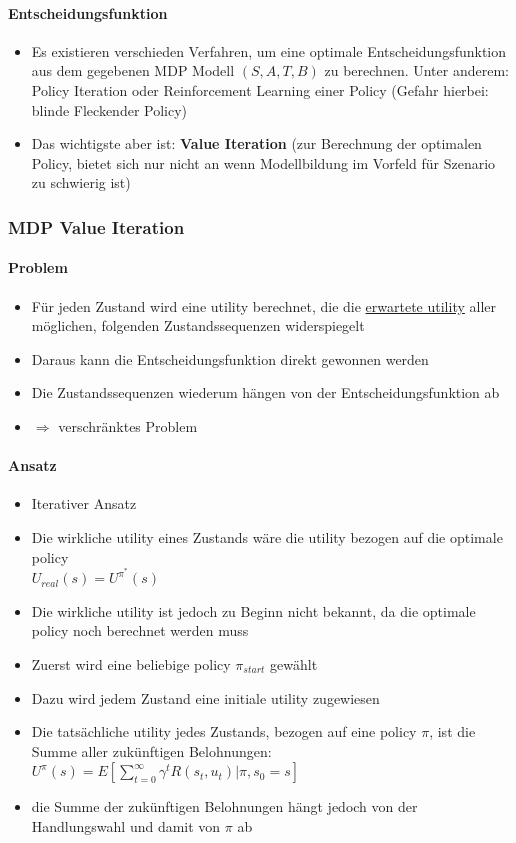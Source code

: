 \paragraph{Entscheidungsfunktion}
\begin{itemize}
	\item Es existieren verschieden Verfahren, um eine optimale Entscheidungsfunktion aus dem gegebenen MDP Modell $(S, A, T, B)$ zu berechnen.
	Unter anderem: Policy Iteration oder Reinforcement Learning einer Policy (Gefahr hierbei: \glqq blinde Flecken\grqq{}der Policy)
	\item Das wichtigste aber ist: \textbf{Value Iteration} (zur Berechnung der optimalen Policy, bietet sich nur nicht an wenn Modellbildung im Vorfeld für Szenario zu schwierig ist)
\end{itemize}

\subsubsection{MDP Value Iteration}

\paragraph{Problem}
\begin{itemize}
	\item F\"ur jeden Zustand wird eine utility berechnet, die die \underline{erwartete utility} aller m\"oglichen, folgenden Zustandssequenzen widerspiegelt
	\item Daraus kann die Entscheidungsfunktion direkt gewonnen werden
	\item Die Zustandssequenzen wiederum h\"angen von der Entscheidungsfunktion ab
	\item $\Rightarrow$ verschr\"anktes Problem
\end{itemize}

\paragraph{Ansatz}
\begin{itemize}
	\item Iterativer Ansatz
	\item Die wirkliche utility eines Zustands w\"are die utility bezogen auf die optimale policy\\ $U_{real}(s) = U^{\pi^*}(s)$
	\item Die wirkliche utility ist jedoch zu Beginn nicht bekannt, da die optimale policy noch berechnet werden muss
	\item Zuerst wird eine beliebige policy $\pi_{start}$ gew\"ahlt
	\item Dazu wird jedem Zustand eine initiale utility zugewiesen
	\item Die tats\"achliche utility jedes Zustands, bezogen auf eine policy $\pi$, ist die Summe aller zuk\"unftigen Belohnungen:
	$U^{\pi}(s) = E \left[ \sum_{t = 0}^{\infty} \gamma^t R(s_t, u_t) | \pi, s_0 = s \right]$
	\item die Summe der zuk\"unftigen Belohnungen h\"angt jedoch von der Handlungswahl und damit von $\pi$ ab
\end{itemize}

